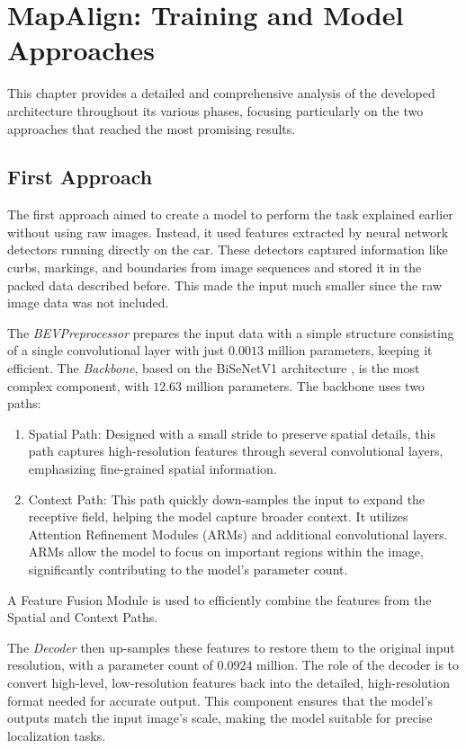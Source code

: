 \NoBgThispage
\chapter{MapAlign: Training and Model Approaches}

This chapter provides a detailed and comprehensive analysis of the developed architecture throughout its various phases, focusing particularly on the two approaches that reached the most promising results.

\section{First Approach}

The first approach aimed to create a model to perform the task explained earlier without using raw images. Instead, it used features extracted by neural network detectors running directly on the car. These detectors captured information like curbs, markings, and boundaries from image sequences and stored it in the packed data described before. This made the input much smaller since the raw image data was not included.

The \textit{BEVPreprocessor} prepares the input data with a simple structure consisting of a single convolutional layer with just $0.0013$ million parameters, keeping it efficient. 
The \textit{Backbone}, based on the BiSeNetV1 architecture \cite{DBLP:journals/corr/abs-1808-00897}, is the most complex component, with $12.63$ million parameters. The backbone uses two paths: 
\begin{enumerate}
    \item Spatial Path: Designed with a small stride to preserve spatial details, this path captures high-resolution features through several convolutional layers, emphasizing fine-grained spatial information.
    \item Context Path: This path quickly down-samples the input to expand the receptive field, helping the model capture broader context. It utilizes Attention Refinement Modules (ARMs) and additional convolutional layers. ARMs allow the model to focus on important regions within the image, significantly contributing to the model's parameter count.
\end{enumerate}
A Feature Fusion Module is used to efficiently combine the features from the Spatial and Context Paths.

The \textit{Decoder} then up-samples these features to restore them to the original input resolution, with a parameter count of $0.0924$ million. The role of the decoder is to convert high-level, low-resolution features back into the detailed, high-resolution format needed for accurate output. This component ensures that the model’s outputs match the input image's scale, making the model suitable for precise localization tasks.

